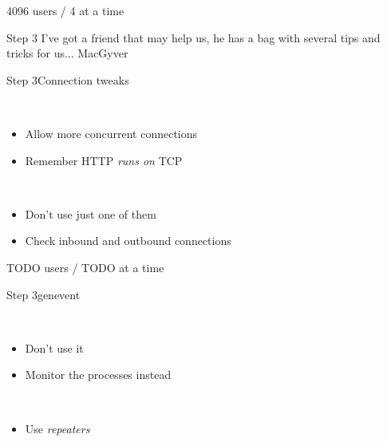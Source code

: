 \documentclass[utf8]{beamer}
\begin{document}
\begin{frame}
4096 users / 4 at a time
\end{frame}

\begin{frame}{Step 3}
I've got a friend that may help us, he has a bag with several tips and tricks for us...
\pause
MacGyver
\end{frame}

\begin{frame}{Step 3}{Connection tweaks}
	\begin{description}
		\item<+->[Backlog]\ \\
			\begin{itemize}
				\item Allow more concurrent connections
				\item Remember HTTP \emph{runs on} TCP
			\end{itemize}
		\item<+->[Connections]\ \\
			\begin{itemize}
				\item Don't use just one of them
				\item Check inbound and outbound connections
			\end{itemize}
	\end{description}
\end{frame}

\begin{frame}
TODO users / TODO at a time
\end{frame}

\begin{frame}{Step 3}{gen\textunderscore event}
	\begin{description}
		\item<+->[sup\textunderscore handler]\ \\
			\begin{itemize}
				\item Don't use it
				\item Monitor the processes instead
			\end{itemize}
		\item<+->[Long Delivery Queues]\ \\
			\begin{itemize}
				\item Use \emph{repeaters}
			\end{itemize}
	\end{description}
\end{frame}
\end{document}
